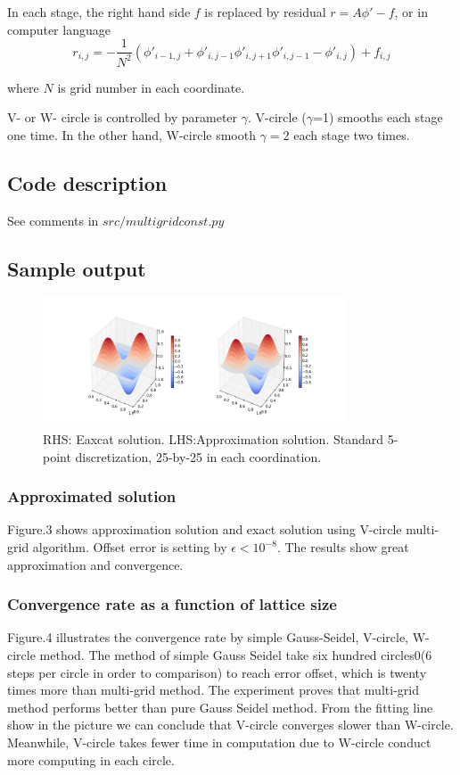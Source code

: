 \documentclass[12pt]{article}
\begin{document}
In each stage, the right hand side $f$ is replaced by residual $r=A\phi'-f$, or in computer language
\begin{equation}
	r_{i,j}=-\frac{1}{N^2}(\phi'_{i-1,j}+\phi'_{i,j-1}\phi'_{i,j+1}\phi'_{i,j-1}-\phi'_{i,j})+f_{i,j}
\end{equation}

where $N$ is grid number in each coordinate.

V- or W- circle is controlled by parameter $\gamma$. V-circle ($\gamma$=1) smooths each stage one time. In the other hand, W-circle smooth $\gamma=2$ each stage two times. 


\subsection{Code description}
See comments in $src/multigridconst.py$
\subsection{Sample output}
\begin{figure}[h!]
	\begin{center}
		\includegraphics[width=0.8\textwidth]{Exact_Approx.png}
		\caption{RHS: Eaxcat solution. LHS:Approximation solution. Standard 5-point discretization, 25-by-25 in each coordination.}
		\label{fig3}
	\end{center}
\end{figure}
\subsubsection{Approximated solution}
Figure.3 shows approximation solution and exact solution using V-circle multi-grid algorithm. Offset error is setting by $\epsilon<10^{-8}$. The results show great approximation and convergence.

\subsubsection{Convergence rate as a function of lattice size}
Figure.4 illustrates the convergence rate by simple Gauss-Seidel, V-circle, W-circle method. The method of simple Gauss Seidel take six hundred circles0(6 steps per circle in order to comparison) to reach error offset, which is twenty times more than multi-grid method. The experiment proves that multi-grid method performs better than pure Gauss Seidel method. From the fitting line show in the picture we can conclude that V-circle converges slower than W-circle. Meanwhile, V-circle takes fewer time in computation due to W-circle conduct more computing in each circle.
\end{document}
